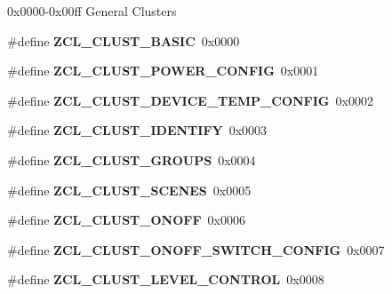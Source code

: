 0x0000-\/0x00ff General Clusters \begin{DoxyCompactItemize}
\item 
\mbox{\label{group__zcl_gaf9a529b80905a98850e72bc153789913}} 
\#define {\bfseries Z\+C\+L\+\_\+\+C\+L\+U\+S\+T\+\_\+\+B\+A\+S\+IC}~0x0000
\item 
\mbox{\label{group__zcl_ga9a1f2c8d3d83f46e48b63db97ffd1658}} 
\#define {\bfseries Z\+C\+L\+\_\+\+C\+L\+U\+S\+T\+\_\+\+P\+O\+W\+E\+R\+\_\+\+C\+O\+N\+F\+IG}~0x0001
\item 
\mbox{\label{group__zcl_gae28407832bda3643467a6b9e35a9332b}} 
\#define {\bfseries Z\+C\+L\+\_\+\+C\+L\+U\+S\+T\+\_\+\+D\+E\+V\+I\+C\+E\+\_\+\+T\+E\+M\+P\+\_\+\+C\+O\+N\+F\+IG}~0x0002
\item 
\mbox{\label{group__zcl_ga01d2578ad705eff1e1bf19b8affdcbac}} 
\#define {\bfseries Z\+C\+L\+\_\+\+C\+L\+U\+S\+T\+\_\+\+I\+D\+E\+N\+T\+I\+FY}~0x0003
\item 
\mbox{\label{group__zcl_gae0f6675dd4154e57413beef821d51392}} 
\#define {\bfseries Z\+C\+L\+\_\+\+C\+L\+U\+S\+T\+\_\+\+G\+R\+O\+U\+PS}~0x0004
\item 
\mbox{\label{group__zcl_gae9c2a6f6108cb9317b17dbaa8e1bf52d}} 
\#define {\bfseries Z\+C\+L\+\_\+\+C\+L\+U\+S\+T\+\_\+\+S\+C\+E\+N\+ES}~0x0005
\item 
\mbox{\label{group__zcl_ga2f39cf2e480d57a36e4345c2e5cd7342}} 
\#define {\bfseries Z\+C\+L\+\_\+\+C\+L\+U\+S\+T\+\_\+\+O\+N\+O\+FF}~0x0006
\item 
\mbox{\label{group__zcl_ga0c50bd8024bac316e6c3b5445adbe24e}} 
\#define {\bfseries Z\+C\+L\+\_\+\+C\+L\+U\+S\+T\+\_\+\+O\+N\+O\+F\+F\+\_\+\+S\+W\+I\+T\+C\+H\+\_\+\+C\+O\+N\+F\+IG}~0x0007
\item 
\mbox{\label{group__zcl_ga08590a00da63decd094dca9eb78e2b8e}} 
\#define {\bfseries Z\+C\+L\+\_\+\+C\+L\+U\+S\+T\+\_\+\+L\+E\+V\+E\+L\+\_\+\+C\+O\+N\+T\+R\+OL}~0x0008
\item 
\mbox{\label{group__zcl_ga660f2cbe707f2fa1089363d782726876}} 

\end{DoxyCompactItemize}

